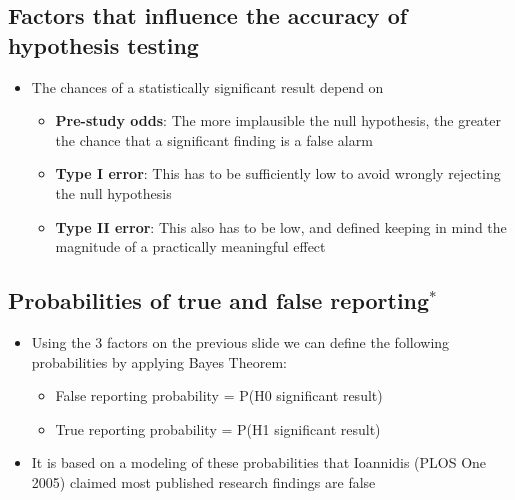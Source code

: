 \documentclass[
]{book}
\providecommand{\tightlist}{%
  \setlength{\itemsep}{0pt}\setlength{\parskip}{0pt}}
\begin{document}
\hypertarget{factors-that-influence-the-accuracy-of-hypothesis-testing}{%
\subsection{Factors that influence the accuracy of hypothesis testing}\label{factors-that-influence-the-accuracy-of-hypothesis-testing}}

\begin{itemize}
\tightlist
\item
  The chances of a statistically significant result depend on

  \begin{itemize}
  \tightlist
  \item
    \textbf{Pre-study odds}: The more implausible the null hypothesis, the greater the chance that a significant finding is a false alarm
  \item
    \textbf{Type I error}: This has to be sufficiently low to avoid wrongly rejecting the null hypothesis
  \item
    \textbf{Type II error}: This also has to be low, and defined keeping in mind the magnitude of a practically meaningful effect
  \end{itemize}
\end{itemize}

\hypertarget{probabilities-of-true-and-false-reporting}{%
\subsection{\texorpdfstring{Probabilities of true and false reporting\(^*\)}{Probabilities of true and false reporting\^{}*}}\label{probabilities-of-true-and-false-reporting}}

\begin{itemize}
\tightlist
\item
  Using the 3 factors on the previous slide we can define the following probabilities by applying Bayes Theorem:

  \begin{itemize}
  \tightlist
  \item
    False reporting probability = P(H0 \textbar{} significant result)
  \item
    True reporting probability = P(H1 \textbar{} significant result)
  \end{itemize}
\item
  It is based on a modeling of these probabilities that Ioannidis (PLOS One 2005) claimed most published research findings are false
\end{itemize}
\end{document}
